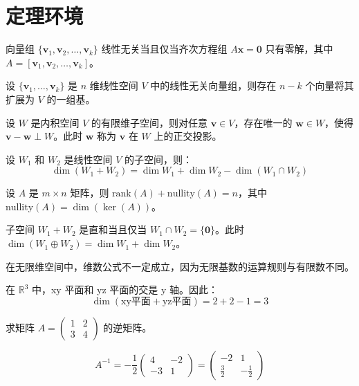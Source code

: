 \section{定理环境}

\begin{theorem}[线性无关的判定]
向量组 \( \{ \mathbf{v}_1, \mathbf{v}_2, \dots, \mathbf{v}_k \} \) 线性无关当且仅当齐次方程组 \( A\mathbf{x} = \mathbf{0} \) 只有零解，其中 \( A = [\mathbf{v}_1, \mathbf{v}_2, \dots, \mathbf{v}_k] \)。
\end{theorem}

\begin{lemma}[基的扩展]
设 \( \{ \mathbf{v}_1, \dots, \mathbf{v}_k \} \) 是 \( n \) 维线性空间 \( V \) 中的线性无关向量组，则存在 \( n - k \) 个向量将其扩展为 \( V \) 的一组基。
\end{lemma}

\begin{lemma}[正交投影]\label{lem:projection}
设 \( W \) 是内积空间 \( V \) 的有限维子空间，则对任意 \( \mathbf{v} \in V \)，存在唯一的 \( \mathbf{w} \in W \)，使得 \( \mathbf{v} - \mathbf{w} \perp W \)。此时 \( \mathbf{w} \) 称为 \( \mathbf{v} \) 在 \( W \) 上的正交投影。
\end{lemma}

\begin{proposition}[维数公式]
设 \( W_1 \) 和 \( W_2 \) 是线性空间 \( V \) 的子空间，则：
\[
\dim(W_1 + W_2) = \dim W_1 + \dim W_2 - \dim(W_1 \cap W_2)
\]
\end{proposition}

\begin{theorem}[秩-零度定理]\label{thm:rank_nullity}
设 \( A \) 是 \( m \times n \) 矩阵，则 \( \text{rank}(A) + \text{nullity}(A) = n \)，其中 \( \text{nullity}(A) = \dim(\ker(A)) \)。
\end{theorem}

\begin{corollary}[直和条件]
子空间 \( W_1 + W_2 \) 是直和当且仅当 \( W_1 \cap W_2 = \{ \mathbf{0} \} \)。此时 \( \dim(W_1 \oplus W_2) = \dim W_1 + \dim W_2 \)。
\end{corollary}

\begin{remark}
在无限维空间中，维数公式不一定成立，因为无限基数的运算规则与有限数不同。
\end{remark}

\begin{example}[子空间示例]
在 \( \mathbb{R}^3 \) 中，xy 平面和 yz 平面的交是 y 轴。因此：
\[
\dim(\text{xy平面} + \text{yz平面}) = 2 + 2 - 1 = 3
\]
\end{example}

\begin{problem}[矩阵求逆]
求矩阵 \( A = \begin{pmatrix} 1 & 2 \\ 3 & 4 \end{pmatrix} \) 的逆矩阵。
\end{problem}

\begin{solution}
\[
A^{-1} = -\frac{1}{2} \begin{pmatrix} 4 & -2 \\ -3 & 1 \end{pmatrix} = \begin{pmatrix} -2 & 1 \\ \frac{3}{2} & -\frac{1}{2} \end{pmatrix}
\]
\end{solution}